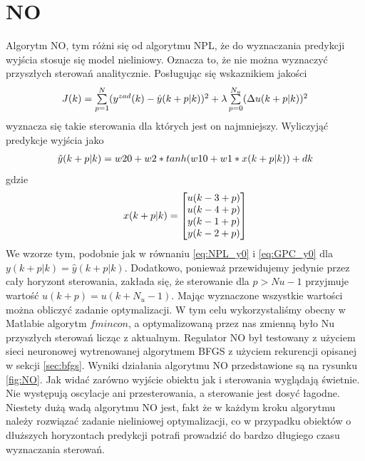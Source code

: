 	\section{NO}
		\label{sec:NO}
		Algorytm NO, tym różni się od algorytmu NPL, że do wyznaczania predykcji wyjścia stosuje się model nieliniowy. Oznacza to, że nie można wyznaczyć przyszłych sterowań analitycznie. Posługując się wskaznikiem jakości
		\begin{equation}
		\begin{tabular}{l}
		$J(k) = \sum\limits_{p=1}^{N}(y^{zad}(k)-\hat{y}(k+p|k))^2+\lambda\sum\limits_{p=0}^{N_u}(\Delta u(k+p|k))^2$
		\end{tabular}
		\label{eq:wsk_jakosc}
		\end{equation}
		wyznacza się takie sterowania dla których jest on najmniejszy.
		Wyliczyjąć predykcje wyjścia jako
		\begin{equation}
		\begin{tabular}{l}
		$\hat{y}(k+p|k)=w20 + w2*tanh(w10+w1*x(k+p|k))+dk$
		\end{tabular}
		\label{eq:NO_wyjscie}
		\end{equation}
		gdzie
		\begin{equation}
		\begin{tabular}{l}
		$x(k+p|k)=\begin{bmatrix}u(k-3+p)\\u(k-4+p)\\y(k-1+p)\\y(k-2+p)\end{bmatrix}$
		\end{tabular}
		\label{eq:NO_wesn}
		\end{equation}
		We wzorze tym, podobnie jak w równaniu \ref{eq:NPL_y0} i \ref{eq:GPC_y0} dla $y(k+p|k)=\hat{y}(k+p|k)$. Dodatkowo, ponieważ przewidujemy jedynie przez cały horyzont sterowania, zakłada się, że sterowanie dla $p>Nu-1$ przyjmuje wartość $u(k+p)=u(k+N_u-1)$. Mając wyznaczone wszystkie wartości można obliczyć zadanie optymalizacji. W tym celu wykorzystaliśmy obecny w Matlabie algorytm $fmincon$, a optymalizowaną przez nas zmienną było Nu przyszłych sterowań licząc z aktualnym.
		Regulator NO był testowany z użyciem sieci neuronowej wytrenowanej algorytmem BFGS z użyciem rekurencji opisanej w sekcji \ref{sec:bfgs}. Wyniki działania algorytmu NO przedstawione są na rysunku \ref{fig:NO}. Jak widać zarówno wyjście obiektu jak i sterowania wyglądają świetnie. Nie występują oscylacje ani przesterowania, a sterowanie jest dosyć łagodne. Niestety dużą wadą algorytmu NO jest, fakt że w każdym kroku algorytmu należy rozwiązać zadanie nieliniowej optymalizacji, co w przypadku obiektów o dłuższych horyzontach predykcji potrafi prowadzić do bardzo długiego czasu wyznaczania sterowań.
		

